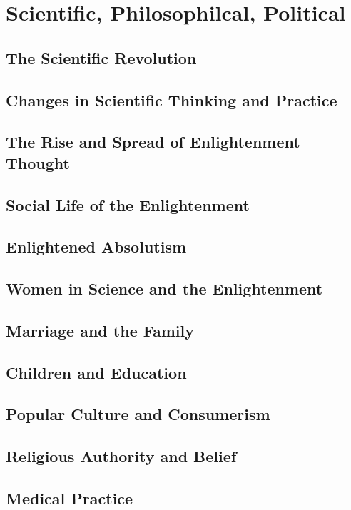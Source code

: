 \documentclass[../euro.tex]{subfiles}
\begin{document}
\chapter{Scientific, Philosophilcal, Political}
\section{The Scientific Revolution}
\section{Changes in Scientific Thinking and Practice}
\section{The Rise and Spread of Enlightenment Thought}
\section{Social Life of the Enlightenment}
\section{Enlightened Absolutism}
\section{Women in Science and the Enlightenment}
\section{Marriage and the Family}
\section{Children and Education}
\section{Popular Culture and Consumerism}
\section{Religious Authority and Belief}
\section{Medical Practice}
\end{document}
